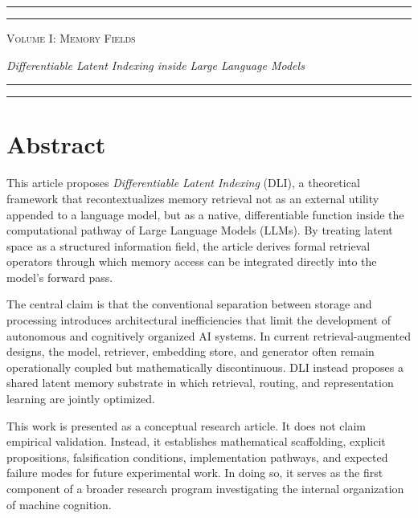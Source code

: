 \begin{titlepage}
    \thispagestyle{empty}
    
    \vfill
    \begin{center}
        \rule{\textwidth}{1.6pt}\vspace*{-\baselineskip}\vspace*{2pt}
        \rule{\textwidth}{0.4pt}\par\vspace{\baselineskip}
        {\Huge \scshape Volume I: Memory Fields}\par\vspace{0.2in}
        {\Large \itshape Differentiable Latent Indexing inside Large Language Models}\par\vspace{3.2pt}
        \rule{\textwidth}{0.4pt}\vspace*{-\baselineskip}\vspace{3.2pt}
        \rule{\textwidth}{1.6pt}
    \end{center}
    \vfill
\end{titlepage}

\chapter*{Abstract}
This article proposes \textit{Differentiable Latent Indexing} (DLI), a theoretical framework that recontextualizes memory retrieval not as an external utility appended to a language model, but as a native, differentiable function inside the computational pathway of Large Language Models (LLMs). By treating latent space as a structured information field, the article derives formal retrieval operators through which memory access can be integrated directly into the model's forward pass.

The central claim is that the conventional separation between storage and processing introduces architectural inefficiencies that limit the development of autonomous and cognitively organized AI systems. In current retrieval-augmented designs, the model, retriever, embedding store, and generator often remain operationally coupled but mathematically discontinuous. DLI instead proposes a shared latent memory substrate in which retrieval, routing, and representation learning are jointly optimized.

This work is presented as a conceptual research article. It does not claim empirical validation. Instead, it establishes mathematical scaffolding, explicit propositions, falsification conditions, implementation pathways, and expected failure modes for future experimental work. In doing so, it serves as the first component of a broader research program investigating the internal organization of machine cognition.

